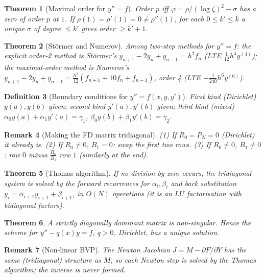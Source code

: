 \documentclass[10pt,a4paper]{article}
\theoremstyle{tight}
\newtheorem{theorem}{Theorem}[section]
\newtheorem{definition}[theorem]{Definition}
\newtheorem{remark}[theorem]{Remark}
\begin{document}
\begin{theorem}[Maximal order for \(y''=f\)]
Order \(p\) iff \(\varphi=\rho/(\log\zeta)^2-\sigma\) has a zero of order \(p\) at \(1\). If
\(\rho(1)=\rho'(1)=0\ne\rho''(1)\), for each \(0\le k'\le k\) a unique \(\sigma\) of degree \(\le k'\)
gives order \(\ge k'+1\).
\end{theorem}

\begin{theorem}[St\"ormer and Numerov]
Among two-step methods for \(y''=f\): the explicit order-2 method is St\"ormer's
\(y_{n+1}-2y_n+y_{n-1}=h^2f_n\) (LTE \(\frac1{12}h^4y^{(4)}\)); the maximal-order method is Numerov's
\(y_{n+1}-2y_n+y_{n-1}=\frac{h^2}{12}(f_{n+1}+10f_n+f_{n-1})\), order 4 (LTE \(-\frac1{240}h^6y^{(6)}\)).
\end{theorem}

\begin{definition}[Boundary conditions for \(y''=f(x,y,y')\)]
First kind (Dirichlet) \(y(a),y(b)\) given; second kind \(y'(a),y'(b)\) given; third kind (mixed)
\(\alpha_0y(a)+\alpha_1y'(a)=\gamma_1\), \(\beta_0y(b)+\beta_1y'(b)=\gamma_2\).
\end{definition}

\begin{remark}[Making the FD matrix tridiagonal]
(1) If \(R_0=P_N=0\) (Dirichlet) it already is. (2) If \(R_0\ne0\), \(B_1=0\): swap the first two rows.
(3) If \(R_0\ne0\), \(B_1\ne0\): row \(0\) minus \(\frac{R_0}{B_1}\) row \(1\) (similarly at the end).
\end{remark}

\begin{theorem}[Thomas algorithm]
If no division by zero occurs, the tridiagonal system is solved by the forward recurrences for
\(\alpha_i,\beta_i\) and back substitution \(y_i=\alpha_{i+1}y_{i+1}+\beta_{i+1}\), in \(O(N)\)
operations (it is an \(LU\) factorisation with bidiagonal factors).
\end{theorem}

\begin{theorem}
A strictly diagonally dominant matrix is non-singular. Hence the scheme for
\(y''-q(x)y=f\), \(q>0\), Dirichlet, has a unique solution.
\end{theorem}

\begin{remark}[Non-linear BVP]
The Newton Jacobian \(J=M-\partial F/\partial Y\) has the same (tridiagonal) structure as \(M\), so each
Newton step is solved by the Thomas algorithm; the inverse is never formed.
\end{remark}
\end{document}
